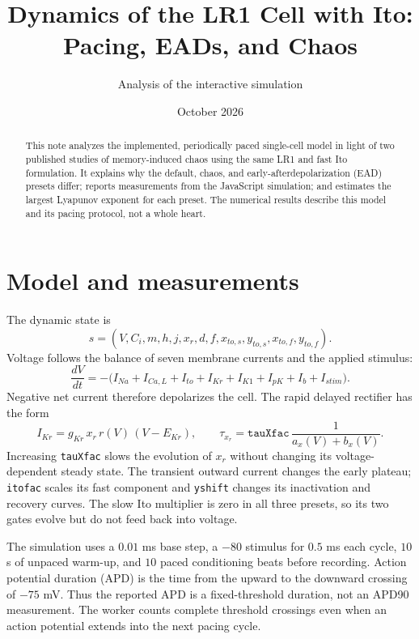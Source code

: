 \documentclass[11pt]{article}
\title{Dynamics of the LR1 Cell with Ito: Pacing, EADs, and Chaos}
\author{Analysis of the interactive simulation}
\date{October 2026}
\begin{document}
\maketitle

\begin{abstract}
This note analyzes the implemented, periodically paced single-cell model in light of two published studies of memory-induced chaos using the same LR1 and fast Ito formulation. It explains why the default, chaos, and early-afterdepolarization (EAD) presets differ; reports measurements from the JavaScript simulation; and estimates the largest Lyapunov exponent for each preset. The numerical results describe this model and its pacing protocol, not a whole heart.
\end{abstract}

\section{Model and measurements}

The dynamic state is
\begin{equation}
 s=(V,C_i,m,h,j,x_r,d,f,x_{to,s},y_{to,s},x_{to,f},y_{to,f}).
\end{equation}
Voltage follows the balance of seven membrane currents and the applied stimulus:
\begin{equation}
 \frac{dV}{dt}=-\bigl(I_{Na}+I_{Ca,L}+I_{to}+I_{Kr}+I_{K1}+I_{pK}+I_b+I_{stim}\bigr).
\end{equation}
Negative net current therefore depolarizes the cell. The rapid delayed rectifier has the form
\begin{equation}
 I_{Kr}=g_{Kr}\,x_r\,r(V)\,(V-E_{Kr}),\qquad
 \tau_{x_r}=\texttt{tauXfac}\,\frac{1}{a_x(V)+b_x(V)}.
\end{equation}
Increasing \texttt{tauXfac} slows the evolution of $x_r$ without changing its voltage-dependent steady state. The transient outward current changes the early plateau; \texttt{itofac} scales its fast component and \texttt{yshift} changes its inactivation and recovery curves. The slow Ito multiplier is zero in all three presets, so its two gates evolve but do not feed back into voltage.

The simulation uses a $0.01$ ms base step, a $-80$ stimulus for $0.5$ ms each cycle, $10$ s of unpaced warm-up, and $10$ paced conditioning beats before recording. Action potential duration (APD) is the time from the upward to the downward crossing of $-75$ mV. Thus the reported APD is a fixed-threshold duration, not an APD90 measurement. The worker counts complete threshold crossings even when an action potential extends into the next pacing cycle.
\end{document}
